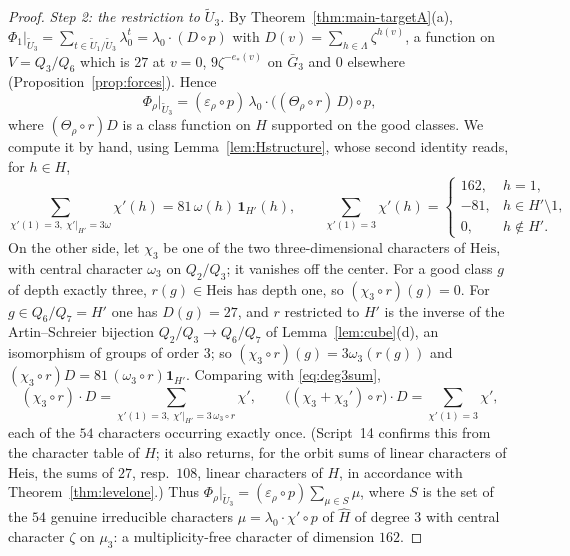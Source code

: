 \documentclass[11pt]{article}
\newcommand{\tU}{\widetilde U}
\theoremstyle{plain}
\theoremstyle{definition}
\begin{document}
\begin{proof}
\emph{Step 2: the restriction to $\tU_3$.}  By
Theorem~\ref{thm:main-targetA}(a), $\Phi_1|_{\tU_3}=\sum_{t\in\tU_1/\tU_3}\lambda_0^t=\lambda_0\cdot(D\circ p)$
with $D(v)=\sum_{h\in\Lambda}\zeta^{h(v)}$, a function on $V=Q_3/Q_6$
which is $27$ at $v=0$, $9\zeta^{-e_*(v)}$ on $\bar G_3$ and $0$
elsewhere (Proposition~\ref{prop:forces}).  Hence
\[
 \Phi_\rho|_{\tU_3}=(\varepsilon_\rho\circ p)\,\lambda_0\cdot\bigl((\Theta_\rho\circ r)\,D\bigr)\circ p ,
\]
where $(\Theta_\rho\circ r)D$ is a class function on $H$ supported on
the good classes.  We compute it by hand, using
Lemma~\ref{lem:Hstructure}, whose second identity reads, for $h\in H$,
\begin{equation}\label{eq:deg3sum}
 \sum_{\chi'(1)=3,\ \chi'|_{H'}=3\omega}\chi'(h)=81\,\omega(h)\,\mathbf 1_{H'}(h),\qquad
 \sum_{\chi'(1)=3}\chi'(h)=\begin{cases}162,&h=1,\\-81,&h\in H'\setminus1,\\0,&h\notin H'.\end{cases}
\end{equation}
On the other side, let $\chi_3$ be one of the two three-dimensional
characters of $\mathrm{Heis}$, with central character $\omega_3$ on
$Q_2/Q_3$; it vanishes off the center.  For a good class $g$ of depth
exactly three, $r(g)\in\mathrm{Heis}$ has depth one, so
$(\chi_3\circ r)(g)=0$.  For $g\in Q_6/Q_7=H'$ one has $D(g)=27$, and
$r$ restricted to $H'$ is the inverse of the Artin--Schreier bijection
$Q_2/Q_3\to Q_6/Q_7$ of Lemma~\ref{lem:cube}(d), an isomorphism of
groups of order $3$; so $(\chi_3\circ r)(g)=3\omega_3(r(g))$ and
$(\chi_3\circ r)D=81\,(\omega_3\circ r)\mathbf 1_{H'}$.  Comparing with
\eqref{eq:deg3sum},
\begin{equation}\label{eq:chi3D}
 (\chi_3\circ r)\cdot D=\sum_{\chi'(1)=3,\ \chi'|_{H'}=3\,\omega_3\circ r}\chi',\qquad
 \bigl((\chi_3+\chi_3')\circ r\bigr)\cdot D=\sum_{\chi'(1)=3}\chi' ,
\end{equation}
each of the $54$ characters occurring exactly once.  (Script~14
confirms this from the character table of $H$; it also returns, for the
orbit sums of linear characters of $\mathrm{Heis}$, the sums of $27$,
resp.\ $108$, linear characters of $H$, in accordance with
Theorem~\ref{thm:levelone}.)  Thus
$\Phi_\rho|_{\tU_3}=(\varepsilon_\rho\circ p)\sum_{\mu\in S}\mu$, where
$S$ is the set of the $54$ genuine irreducible characters
$\mu=\lambda_0\cdot\chi'\circ p$ of $\hat H$ of degree $3$ with central
character $\zeta$ on $\mu_3$: a multiplicity-free character of
dimension $162$.


\end{proof}
\end{document}
